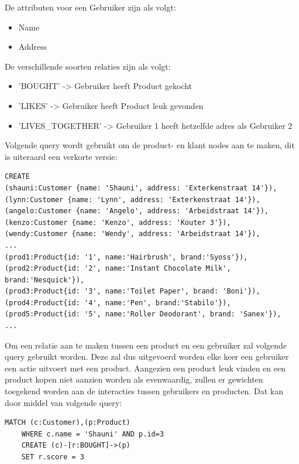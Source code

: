 De attributen voor een Gebruiker zijn als volgt:
\begin{itemize}
	\item Name
	\item Address
\end{itemize}

De verschillende soorten relaties zijn als volgt:
\begin{itemize}
	\item 'BOUGHT' -> Gebruiker heeft Product gekocht
	\item 'LIKES' -> Gebruiker heeft Product leuk gevonden
	\item 'LIVES\_TOGETHER' -> Gebruiker 1 heeft hetzelfde adres als Gebruiker 2
\end{itemize}

Volgende query wordt gebruikt om de product- en klant nodes aan te maken, dit is uiteraard een verkorte versie:

\begin{lstlisting}[caption={Neo4j query voor het aanmaken van producten en klanten}]
CREATE 
(shauni:Customer {name: 'Shauni', address: 'Exterkenstraat 14'}),
(lynn:Customer {name: 'Lynn', address: 'Exterkenstraat 14'}),
(angelo:Customer {name: 'Angelo', address: 'Arbeidstraat 14'}), 
(kenzo:Customer {name: 'Kenzo', address: 'Kouter 3'}), 
(wendy:Customer {name: 'Wendy', address: 'Arbeidstraat 14'}), 
...
(prod1:Product{id: '1', name:'Hairbrush', brand:'Syoss'}), 
(prod2:Product{id: '2', name:'Instant Chocolate Milk', brand:'Nesquick'}), 
(prod3:Product{id: '3', name:'Toilet Paper', brand: 'Boni'}), 
(prod4:Product{id: '4', name:'Pen', brand:'Stabilo'}), 
(prod5:Product{id: '5', name:'Roller Deodorant', brand: 'Sanex'}), 
...
\end{lstlisting}

Om een relatie aan te maken tussen een product en een gebruiker zal volgende query gebruikt worden. Deze zal dus uitgevoerd worden elke keer een gebruiker een actie uitvoert met een product.
Aangezien een product leuk vinden en een product kopen niet aanzien worden als evenwaardig, zullen er gewichten toegekend worden aan de interacties tussen gebruikers en producten.  Dat kan door middel van volgende query:

\begin{lstlisting}[caption={Neo4j query voor het aanmaken van een relatie tussen een product en een klant}]
	MATCH (c:Customer),(p:Product) 
	WHERE c.name = 'Shauni' AND p.id=3 
	CREATE (c)-[r:BOUGHT]->(p) 
	SET r.score = 3
\end{lstlisting}

